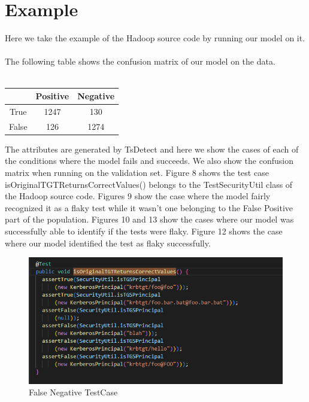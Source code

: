 \documentclass[sigconf,review]{acmart}
\begin{document}
\section{Example}
\label{section:Example}
Here we take the example of the Hadoop source code by running our model on it.
\\
\\
The following table shows the confusion matrix of our model on the data.\\
\\
\begin{center}
\begin{tabular}{|c|c|c|}
\hline
     & Positive & Negative \\
\hline
True & 1247 & 130 \\
\hline
False & 126 & 1274 \\
\hline
\end{tabular}
\end{center}

The attributes are generated by TsDetect and here we show the cases of each of the conditions where the model fails and succeeds. We also show the confusion matrix when running on the validation set. Figure 8 shows the test case isOriginalTGTReturnsCorrectValues() belongs to the TestSecurityUtil class of the Hadoop source code. Figures 9 show the case where the model fairly recognized it as a flaky test while it wasn't one belonging to the False Positive part of the population. Figures 10 and 13 show the cases where our model was successfully able to identify if the tests were flaky. Figure 12 shows the case where our model identified the test as flaky successfully.


\begin{figure}
    \centering
    \includegraphics[scale=0.4]{ConfusionMatrix/fntest.png}
    \caption{False Negative TestCase}
    \label{fig:my_label}
\end{figure}
\end{document}
